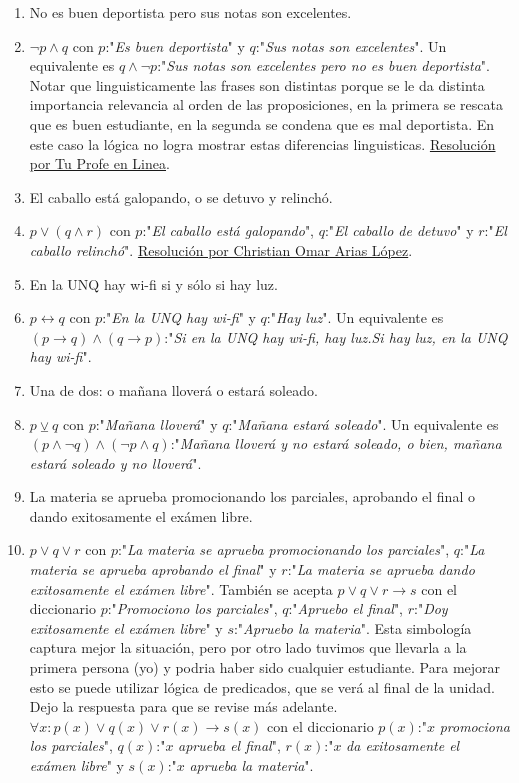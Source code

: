 \documentclass[a4paper]{article}
\newcommand{\answer}{\item[**]}
\newcommand{\then}{\to}
\newcommand{\eq}{\leftrightarrow}
\newcommand{\xor}{\veebar}
\begin{document}
\begin{enumerate}
\begin{multicols}{2}
\begin{enumerate} [label=(\alph*)]
		\item No es buen deportista pero sus notas son excelentes.
		\answer $\neg p \land q$ con $p$:"\textit{Es buen deportista}" y $q$:"\textit{Sus notas son excelentes}". Un equivalente es $q \land \neg p$:"\textit{Sus notas son excelentes pero no es buen deportista}". Notar que linguisticamente las frases son distintas porque se le da distinta importancia relevancia al orden de las proposiciones, en la primera se rescata que es buen estudiante, en la segunda se condena que es mal deportista. En este caso la lógica no logra mostrar estas diferencias linguisticas. \href{https://youtu.be/HXzyX5XGPp8?t=503}{Resolución por Tu Profe en Linea}.

		\item El caballo está galopando, o se detuvo y relinchó.
		\answer $p \lor (q \land r)$ con $p$:"\textit{El caballo está galopando}", $q$:"\textit{El caballo de detuvo}" y $r$:"\textit{El caballo relinchó}". \href{https://youtu.be/TgwraosKUuY?t=70}{Resolución por Christian Omar Arias López}.

		\item En la UNQ hay wi-fi si y sólo si hay luz.
		\answer $p\eq q$ con $p$:"\textit{En la UNQ hay wi-fi}" y $q$:"\textit{Hay luz}". Un equivalente es $(p \then q) \land (q \then p)$:"\textit{Si en la UNQ hay wi-fi, hay luz.Si hay luz, en la UNQ hay wi-fi}".

		\item Una de dos: o mañana lloverá o estará soleado. 
		\answer $p \xor q$ con $p$:"\textit{Mañana lloverá}" y $q$:"\textit{Mañana estará soleado}". Un equivalente es $(p \land \neg q) \land (\neg p \land q)$:"\textit{Mañana lloverá y no estará soleado, o bien, mañana estará soleado y no lloverá}". 

		\item La materia se aprueba promocionando los parciales, aprobando el final o dando exitosamente el exámen libre. 
		\answer $p \lor q \lor r$ con $p$:"\textit{La materia se aprueba promocionando los parciales}", $q$:"\textit{La materia se aprueba aprobando el final}" y $r$:"\textit{La materia se aprueba dando exitosamente el exámen libre}". También se acepta $p \lor q \lor r \then s$ con el diccionario $p$:"\textit{Promociono los parciales}", $q$:"\textit{Apruebo el final}", $r$:"\textit{Doy exitosamente el exámen libre}" y $s$:"\textit{Apruebo la materia}". Esta simbología captura mejor la situación, pero por otro lado tuvimos que llevarla a la primera persona (yo) y podria haber sido cualquier estudiante. Para mejorar esto se puede utilizar lógica de predicados, que se verá al final de la unidad. Dejo la respuesta para que se revise más adelante. $\forall x: p(x) \lor q(x) \lor r(x) \then s(x)$ con el diccionario $p(x)$:"$x$ \textit{promociona los parciales}", $q(x)$:"$x$ \textit{aprueba el final}", $r(x)$:"$x$ \textit{da exitosamente el exámen libre}" y $s(x)$:"$x$ \textit{aprueba la materia}".


\end{enumerate}
\end{multicols}
\end{enumerate}
\end{document}
